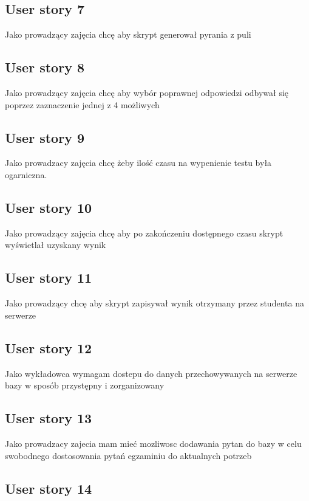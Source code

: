 \documentclass[a4paper]{article}
\begin{document}
\subsection{User story 7}

Jako prowadzący zajęcia chcę aby skrypt generował pyrania z puli

\subsection{User story 8}

Jako prowadzący zajęcia chcę aby wybór poprawnej odpowiedzi odbywał się poprzez zaznaczenie jednej z 4 możliwych

\subsection{User story 9}

Jako prowadzacy zajęcia chcę żeby ilość czasu na wypenienie testu była ogarniczna.

\subsection{User story 10}

Jako prowadzący zajęcia chcę aby po zakończeniu dostępnego czasu skrypt wyświetlał uzyskany wynik

\subsection{User story 11}

Jako prowadzący chcę aby skrypt zapisywał wynik otrzymany przez studenta na serwerze

\subsection{User story 12}

Jako wykładowca wymagam dostepu do danych przechowywanych na serwerze bazy w sposób przystępny i zorganizowany

\subsection{User story 13}

Jako prowadzacy zajecia mam mieć mozliwosc dodawania pytan do bazy w celu swobodnego dostosowania pytań egzaminiu do aktualnych potrzeb

\subsection{User story 14}
\end{document}
